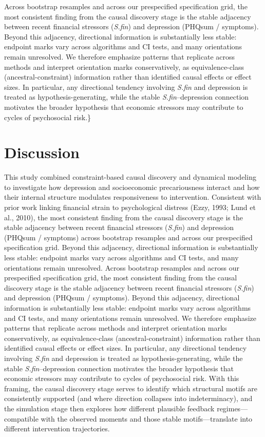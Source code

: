 \documentclass[
]{article}
\begin{document}
\restoregeometry

Across bootstrap resamples and across our prespecified specification
grid, the most consistent finding from the causal discovery stage is the
stable adjacency between recent financial stressors (\textit{S.fin}) and
depression (PHQsum / symptoms). Beyond this adjacency, directional
information is substantially less stable: endpoint marks vary across
algorithms and CI tests, and many orientations remain unresolved. We
therefore emphasize patterns that replicate across methods and interpret
orientation marks conservatively, as equivalence-class
(ancestral-constraint) information rather than identified causal effects
or effect sizes. In particular, any directional tendency involving
\textit{S.fin} and depression is treated as hypothesis-generating, while
the stable \textit{S.fin}--depression connection motivates the broader
hypothesis that economic stressors may contribute to cycles of
psychosocial risk.\}

\section{Discussion}\label{discussion}

This study combined constraint-based causal discovery and dynamical
modeling to investigate how depression and socioeconomic precariousness
interact and how their internal structure modulates responsiveness to
intervention. Consistent with prior work linking financial strain to
psychological distress (Ezzy, 1993; Lund et al., 2010),
\textcolor{BrickRed}{the most consistent finding from the causal discovery stage is the stable adjacency between recent financial stressors (\textit{S.fin}) and depression (PHQsum / symptoms) across bootstrap resamples and across our prespecified specification grid. Beyond this adjacency, directional information is substantially less stable: endpoint marks vary across algorithms and CI tests, and many orientations remain unresolved.}
\textcolor{BrickRed}{
Across bootstrap resamples and across our prespecified specification grid, the most consistent finding from the causal discovery stage is the stable adjacency between recent financial stressors (\textit{S.fin}) and depression (PHQsum / symptoms). Beyond this adjacency, directional information is substantially less stable: endpoint marks vary across algorithms and CI tests, and many orientations remain unresolved. We therefore emphasize patterns that replicate across methods and interpret orientation marks conservatively, as equivalence-class (ancestral-constraint) information rather than identified causal effects or effect sizes. In particular, any directional tendency involving \textit{S.fin} and depression is treated as hypothesis-generating, while the stable \textit{S.fin}--depression connection motivates the broader hypothesis that economic stressors may contribute to cycles of psychosocial risk.}
\textcolor{BrickRed}{
With this framing, the causal discovery stage serves to identify which structural motifs are consistently supported (and where direction collapses into indeterminacy), and the simulation stage then explores how different plausible feedback regimes—compatible with the observed moments and those stable motifs—translate into different intervention trajectories.}
\end{document}
